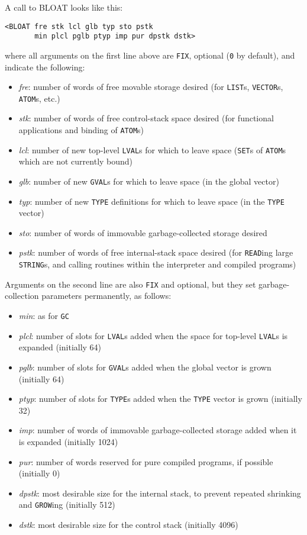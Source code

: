 \documentclass[a4paper]{scrbook}
\providecommand{\tightlist}{%
  \setlength{\itemsep}{0pt}\setlength{\parskip}{0pt}}
\begin{document}
A call to BLOAT looks like this:

\begin{verbatim}
<BLOAT fre stk lcl glb typ sto pstk
       min plcl pglb ptyp imp pur dpstk dstk>
\end{verbatim}

where all arguments on the first line above are \texttt{FIX}, optional (\texttt{0} by default), and indicate the following:

\begin{itemize}
\tightlist
\item
  \emph{fre}: number of words of free movable storage desired (for \texttt{LIST}s, \texttt{VECTOR}s, \texttt{ATOM}s, etc.)
\item
  \emph{stk}: number of words of free control-stack space desired (for functional applications and binding of
  \texttt{ATOM}s)
\item
  \emph{lcl}: number of new top-level \texttt{LVAL}s for which to leave space (\texttt{SET}s of \texttt{ATOM}s which are
  not currently bound)
\item
  \emph{glb}: number of new \texttt{GVAL}s for which to leave space (in the global vector)
\item
  \emph{typ}: number of new \texttt{TYPE} definitions for which to leave space (in the \texttt{TYPE} vector)
\item
  \emph{sto}: number of words of immovable garbage-collected storage desired
\item
  \emph{pstk}: number of words of free internal-stack space desired (for \texttt{READ}ing large \texttt{STRING}s, and
  calling routines within the interpreter and compiled programs)
\end{itemize}

Arguments on the second line are also \texttt{FIX} and optional, but they set garbage-collection parameters permanently, as
follows:

\begin{itemize}
\tightlist
\item
  \emph{min}: as for \texttt{GC}
\item
  \emph{plcl}: number of slots for \texttt{LVAL}s added when the space for top-level \texttt{LVAL}s is expanded (initially
  64)
\item
  \emph{pglb}: number of slots for \texttt{GVAL}s added when the global vector is grown (initially 64)
\item
  \emph{ptyp}: number of slots for \texttt{TYPE}s added when the \texttt{TYPE} vector is grown (initially 32)
\item
  \emph{imp}: number of words of immovable garbage-collected storage added when it is expanded (initially 1024)
\item
  \emph{pur}: number of words reserved for pure compiled programs, if possible (initially 0)
\item
  \emph{dpstk}: most desirable size for the internal stack, to prevent repeated shrinking and \texttt{GROW}ing (initially
  512)
\item
  \emph{dstk}: most desirable size for the control stack (initially 4096)
\end{itemize}
\end{document}
